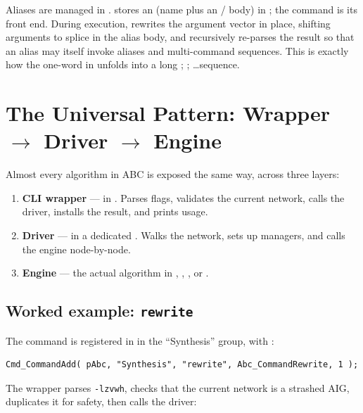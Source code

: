 Aliases are managed in . 
stores an  (name plus an / body) in
; the  command is its front end. During execution,
 rewrites the argument vector in place, shifting arguments to
splice in the alias body, and recursively re-parses the result so that an alias
may itself invoke aliases and multi-command sequences. This is exactly how the
one-word  in  unfolds into a long ;
; \ldots sequence.

\section{The Universal Pattern: Wrapper $\to$ Driver $\to$ Engine}
\label{sec:pattern}

Almost every algorithm in ABC is exposed the same way, across three layers:

\begin{enumerate}
\item \textbf{CLI wrapper} ---  in
      . Parses flags, validates the current network,
      calls the driver, installs the result, and prints usage.
\item \textbf{Driver} ---  in a dedicated
      . Walks the network, sets up managers, and
      calls the engine node-by-node.
\item \textbf{Engine} --- the actual algorithm in ,
      , , or .
\end{enumerate}

\subsection{Worked example: \texttt{rewrite}}

The command is registered in  in the ``Synthesis''
group, with :

\begin{lstlisting}[style=abccode]
Cmd_CommandAdd( pAbc, "Synthesis", "rewrite", Abc_CommandRewrite, 1 );
\end{lstlisting}

The wrapper  parses \texttt{-lzvwh}, checks that the
current network is a strashed AIG, duplicates it for safety, then calls the
driver:

